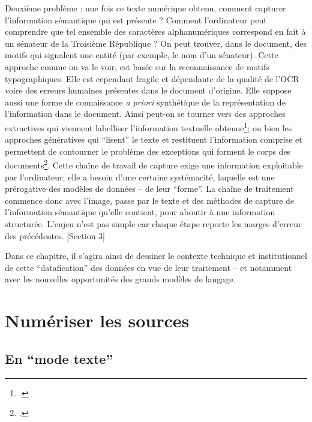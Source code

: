Deuxième problème : une fois ce texte numérique obtenu, comment capturer l'information sémantique qui est présente ? Comment l'ordinateur peut comprendre que tel ensemble des caractères alphanumériques correspond en fait à un sénateur de la Troisième République ? On peut trouver, dans le document, des motifs qui signalent une entité (par exemple, le nom d'un sénateur). Cette approche comme on va le voir, est basée sur la reconnaissance de motifs typographiques. Elle est cependant fragile et dépendante de la qualité de l'OCR -- voire des erreurs humaines présentes dans le document d'origine. Elle suppose aussi une forme de connaissance \emph{a priori} synthétique de la représentation de l'information dans le document. Ainsi peut-on se tourner vers des approches extractives qui viennent labelliser l'information textuelle obtenue\footcite[][]{finkel}; ou bien les approches génératives qui \enquote{lisent} le texte et restituent l'information comprise et permettent de contourner le problème des exceptions qui forment le corps des documents\footcite[][]{radford}. Cette chaîne de travail de capture exige une information exploitable par l'ordinateur; elle a besoin d'une certaine systémacité, laquelle est une prérogative des modèles de données -- de leur \enquote{forme}. La chaîne de traitement commence donc avec l'image, passe par le texte et des méthodes de capture de l'information sémantique qu'elle contient, pour aboutir à une information structurée. L'enjeu n'est pas simple car chaque étape reporte les marges d'erreur des précédentes. [Section 3]

Dans ce chapitre, il s'agira ainsi de dessiner le contexte technique et institutionnel de cette \enquote{datafication} des données en vue de leur traitement -- et notamment avec les nouvelles opportunités des grands modèles de langage.

\section{Numériser les sources}

\subsection{En \enquote{mode texte}}

